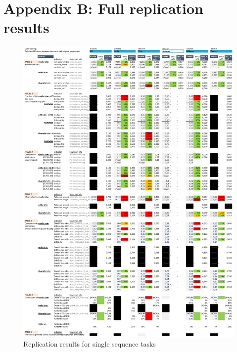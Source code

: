 \newpage

\section*{Appendix B: Full replication results}
\begin{figure}[h]
\includegraphics[scale=0.7, left]{./figures/repl_sst.pdf}
\caption{Replication results for single sequence tasks}
\label{fig:repr_test}
\end{figure}

\newpage

